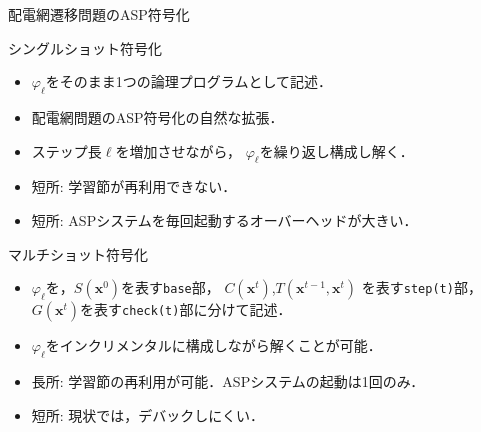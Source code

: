 \documentclass[dvipdfmx,11pt]{beamer}
\newcommand{\code}[1]{\lstinline[basicstyle=\ttfamily]{#1}}
\begin{document}
\begin{frame}{配電網遷移問題のASP符号化}
   \begin{block}{シングルショット符号化}
    \begin{itemize}
     \item $\varphi_{\ell}$をそのまま1つの論理プログラムとして記述．
     \item 配電網問題のASP符号化の自然な拡張．
    \end{itemize}
   \end{block}
     \begin{itemize}
      \item ステップ長$\ell$を増加させながら，
            $\varphi_{\ell}$を繰り返し構成し解く．
      \item 短所: 学習節が再利用できない．
      \item 短所: ASPシステムを毎回起動するオーバーヘッドが大きい．
     \end{itemize}
    \begin{alertblock}{マルチショット符号化}
     \begin{itemize}
      \item $\varphi_{\ell}$を，$S(\boldsymbol{x}^{0})$を表す\code{base}部，
            $C(\boldsymbol{x}^{t})$,$T(\boldsymbol{x}^{t-1},\boldsymbol{x}^{t})$
            を表す\code{step(t)}部，
            $G(\boldsymbol{x}^{t})$を表す\code{check(t)}部に分けて記述．
     \end{itemize}
    \end{alertblock}
     \begin{itemize}
      \item %
            $\varphi_{\ell}$をインクリメンタルに構成しながら解くことが可能．
      \item 長所: 学習節の再利用が可能．ASPシステムの起動は1回のみ．
      \item 短所: 現状では，デバックしにくい．
     \end{itemize} 
\end{frame}
\end{document}
